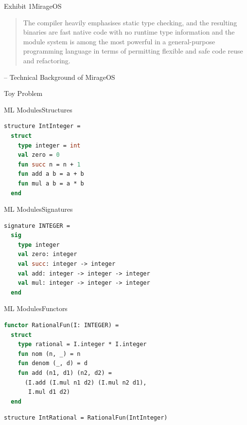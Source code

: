 \documentclass{beamer}
\begin{document}
\begin{frame}{Exhibit 1}{MirageOS}
\begin{quote}
The compiler heavily emphasises static type checking, and the resulting binaries are fast native code with no runtime type information and the module system is among the most powerful in a general-purpose programming language in terms of permitting flexible and safe code reuse and refactoring.
\end{quote}
-- Technical Background of MirageOS
\end{frame}

\begin{frame}{Toy Problem}
\end{frame}

\begin{frame}[fragile]{ML Modules}{Structures}
\begin{lstlisting}[language=ML]
structure IntInteger =
  struct
    type integer = int
    val zero = 0
    fun succ n = n + 1
    fun add a b = a + b
    fun mul a b = a * b
  end
\end{lstlisting}
\end{frame}

\begin{frame}[fragile]{ML Modules}{Signatures}
\begin{lstlisting}[language=ML]
signature INTEGER =
  sig
    type integer
    val zero: integer
    val succ: integer -> integer
    val add: integer -> integer -> integer
    val mul: integer -> integer -> integer
  end
\end{lstlisting}
\end{frame}

\begin{frame}[fragile]{ML Modules}{Functors}
\begin{lstlisting}[language=ML]
functor RationalFun(I: INTEGER) =
  struct
    type rational = I.integer * I.integer
    fun nom (n, _) = n
    fun denom (_, d) = d
    fun add (n1, d1) (n2, d2) =
      (I.add (I.mul n1 d2) (I.mul n2 d1),
       I.mul d1 d2)
  end
\end{lstlisting}
\begin{lstlisting}[language=ML]
structure IntRational = RationalFun(IntInteger)
\end{lstlisting}
\end{frame}
\end{document}

